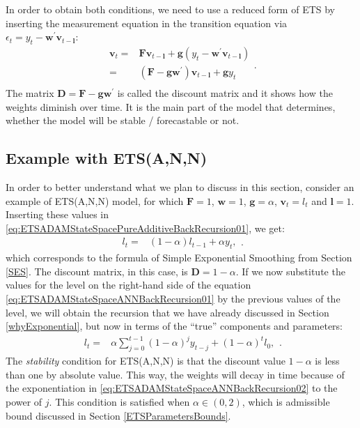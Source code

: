 \documentclass[]{book}
\theoremstyle{definition}
\theoremstyle{definition}
\theoremstyle{definition}
\theoremstyle{definition}
\theoremstyle{remark}
\begin{document}
In order to obtain both conditions, we need to use a reduced form of ETS by inserting the measurement equation in the transition equation via \(\epsilon_t= {y}_{t} -\mathbf{w}^\prime \mathbf{v}_{t-\mathbf{l}}\):
\begin{equation}
  \begin{aligned}
    \mathbf{v}_{t} = &\mathbf{F} \mathbf{v}_{t-\mathbf{l}} + \mathbf{g} \left({y}_{t} -\mathbf{w}^\prime \mathbf{v}_{t-\mathbf{l}} \right)\\
    = & \left(\mathbf{F} -\mathbf{g}\mathbf{w}^\prime \right) \mathbf{v}_{t-\mathbf{l}} + \mathbf{g} {y}_{t} \\
  \end{aligned}.
  \label{eq:ETSADAMStateSpacePureAdditiveBackRecursion01}
\end{equation}
The matrix \(\mathbf{D}=\mathbf{F} -\mathbf{g}\mathbf{w}^\prime\) is called the discount matrix and it shows how the weights diminish over time. It is the main part of the model that determines, whether the model will be stable / forecastable or not.

\hypertarget{example-with-etsann-1}{%
\subsection{Example with ETS(A,N,N)}\label{example-with-etsann-1}}

In order to better understand what we plan to discuss in this section, consider an example of ETS(A,N,N) model, for which \(\mathbf{F}=1\), \(\mathbf{w}=1\), \(\mathbf{g}=\alpha\), \(\mathbf{v}_t=l_t\) and \(\mathbf{l}=1\). Inserting these values in \eqref{eq:ETSADAMStateSpacePureAdditiveBackRecursion01}, we get:
\begin{equation}
  \begin{aligned}
    l_{t} = & \left(1 -\alpha \right) {l}_{t-1} + \alpha {y}_{t},
  \end{aligned}.
  \label{eq:ETSADAMStateSpaceANNBackRecursion01}
\end{equation}
which corresponds to the formula of Simple Exponential Smoothing from Section \ref{SES}. The discount matrix, in this case, is \(\mathbf{D}=1-\alpha\). If we now substitute the values for the level on the right-hand side of the equation \eqref{eq:ETSADAMStateSpaceANNBackRecursion01} by the previous values of the level, we will obtain the recursion that we have already discussed in Section \ref{whyExponential}, but now in terms of the ``true'' components and parameters:
\begin{equation}
  \begin{aligned}
    l_{t} = & {\alpha} \sum_{j=0}^{t-1} (1 -{\alpha})^j {y}_{t-j} + (1 -{\alpha})^t l_0,
  \end{aligned}.
  \label{eq:ETSADAMStateSpaceANNBackRecursion02}
\end{equation}
The \emph{stability} condition for ETS(A,N,N) is that the discount value \(1-\alpha\) is less than one by absolute value. This way, the weights will decay in time because of the exponentiation in \eqref{eq:ETSADAMStateSpaceANNBackRecursion02} to the power of \(j\). This condition is satisfied when \(\alpha \in(0, 2)\), which is admissible bound discussed in Section \ref{ETSParametersBounds}.
\end{document}
